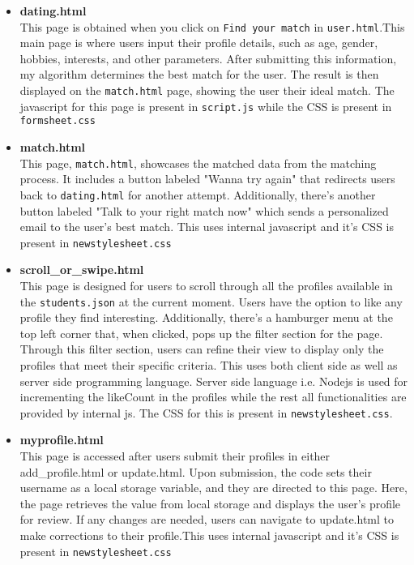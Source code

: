 \documentclass{article}
\begin{document}
\begin{itemize}
   \item \textbf{dating.html}\\
   This page is obtained when you click on \texttt{Find your match} in \texttt{user.html}.This main page is where users input their profile details, such as age, gender, hobbies, interests, and other parameters. After submitting this information, my algorithm determines the best match for the user. The result is then displayed on the \texttt{match.html} page, showing the user their ideal match.
   The javascript for this page is present in \texttt{script.js} while the CSS is present in \texttt{formsheet.css}
    
    \item \textbf{match.html}\\
    This page, \texttt{match.html}, showcases the matched data from the matching process. It includes a button labeled "Wanna try again" that redirects users back to \texttt{dating.html} for another attempt. Additionally, there's another button labeled "Talk to your right match now" which sends a personalized email to the user's best match. This uses internal javascript and it's CSS is present in \texttt{newstylesheet.css}
    
    \item \textbf{scroll\_or\_swipe.html}\\
    This page is designed for users to scroll through all the profiles available in the \texttt{students.json} at the current moment. Users have the option to like any profile they find interesting. Additionally, there's a hamburger menu at the top left corner that, when clicked, pops up the filter section for the page. Through this filter section, users can refine their view to display only the profiles that meet their specific criteria. This uses both client side as well as server side programming language. Server side language i.e. Nodejs is used for incrementing the likeCount in the profiles while the rest all functionalities are provided by internal js. The CSS for this is present in \texttt{newstylesheet.css}.
    
    \item \textbf{myprofile.html}\\
    This page is accessed after users submit their profiles in either add\_profile.html or update.html. Upon submission, the code sets their username as a local storage variable, and they are directed to this page. Here, the page retrieves the value from local storage and displays the user's profile for review. If any changes are needed, users can navigate to update.html to make corrections to their profile.This uses internal javascript and it's CSS is present in \texttt{newstylesheet.css}
    \end{itemize}
\end{document}
